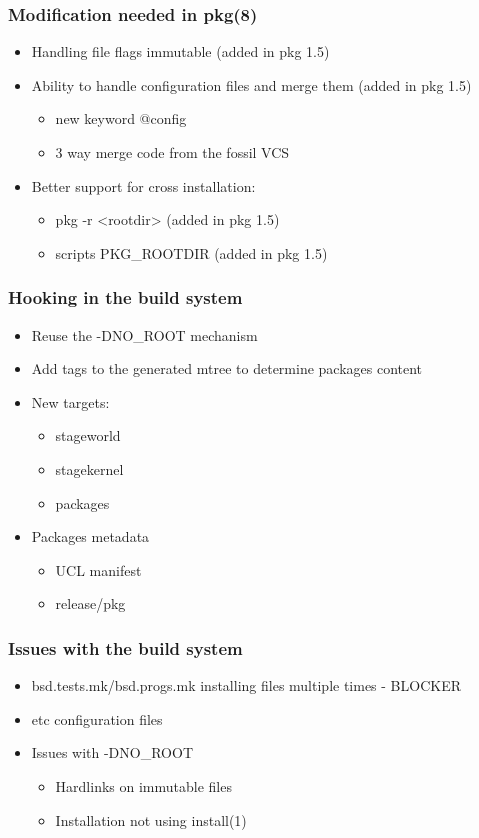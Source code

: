 \begin{frame}
	\frametitle{Modification needed in pkg(8)}
	\begin{itemize}
		\item Handling file flags immutable (added in pkg 1.5)
		\item Ability to handle configuration files and merge them (added in pkg 1.5)
			\begin{itemize}
				\item new keyword @config
				\item 3 way merge code from the fossil VCS
			\end{itemize}
		\item Better support for cross installation:
			\begin{itemize}
				\item pkg -r <rootdir> (added in pkg 1.5)
				\item scripts PKG\_ROOTDIR (added in pkg 1.5)
			\end{itemize}
	\end{itemize}
\end{frame}

\begin{frame}
	\frametitle{Hooking in the build system}
	\begin{itemize}
		\item Reuse the -DNO\_ROOT mechanism
		\item Add tags to the generated mtree to determine packages content
		\item New targets:
			\begin{itemize}
				\item stageworld
				\item stagekernel
				\item packages
			\end{itemize}
		\item Packages metadata
			\begin{itemize}
				\item UCL manifest
				\item release/pkg
			\end{itemize}
	\end{itemize}
\end{frame}

\begin{frame}
	\frametitle{Issues with the build system}
	\begin{itemize}
		\item bsd.tests.mk/bsd.progs.mk installing files multiple times - BLOCKER
		\item etc configuration files
		\item Issues with -DNO\_ROOT
			\begin{itemize}
				\item Hardlinks on immutable files
				\item Installation not using install(1)
			\end{itemize}
	\end{itemize}
\end{frame}

